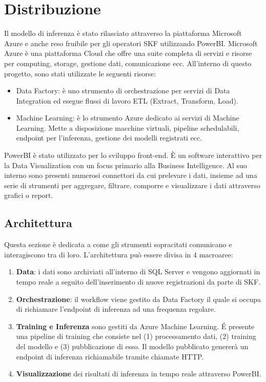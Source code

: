 \chapter{Distribuzione}
\label{chap:deploy}

Il modello di inferenza è stato rilasciato attraverso la piattaforma Microsoft Azure e anche reso fruibile per gli operatori SKF utilizzando PowerBI.
Microsoft Azure è una piattaforma Cloud che offre una suite completa di servizi e risorse per computing, storage, gestione dati, comunicazione ecc.
All'interno di questo progetto, sono stati utilizzate le seguenti risorse:
\begin{itemize}
	\item Data Factory: è uno strumento di orchestrazione per servizi di Data Integration ed esegue flussi di lavoro ETL (Extract, Transform, Load).
	\item Machine Learning: è lo strumento Azure dedicato ai servizi di Machine Learning. Mette a disposizione macchine virtuali, pipeline schedulabili, endpoint per l'inferenza, gestione dei modelli registrati ecc.
\end{itemize}

PowerBI è stato utilizzato per lo sviluppo front-end. È un software interattivo per la Data Visualization con un focus primario alla Business Intelligence. Al suo interno sono presenti numerosi connettori da cui prelevare i dati, insieme ad una serie di strumenti per aggregare, filtrare, comporre e visualizzare i dati attraverso grafici o report.

\section{Architettura}
Questa sezione è dedicata a come gli strumenti sopracitati comunicano e interagiscono tra di loro. L'architettura può essere divisa in 4 macroaree:
\begin{enumerate}
	\item \textbf{Data}: i dati sono archiviati all'interno di SQL Server e vengono aggiornati in tempo reale a seguito dell'inserimento di nuove registrazioni da parte di SKF.
	\item \textbf{Orchestrazione}: il workflow viene gestito da Data Factory il quale si occupa di richiamare l'endpoint di inferenza ad una frequenza regolare.
	\item \textbf{Training e Inferenza} sono gestiti da Azure Machine Learning. É presente una pipeline di training che consiste nel (1) processamento dati, (2) training del modello e (3) pubblicazione di esso. Il modello pubblicato genererà un endpoint di inferenza richiamabile tramite chiamate HTTP. 
	\item \textbf{Visualizzazione} dei risultati di inferenza in tempo reale attraverso PowerBI.
\end{enumerate}

